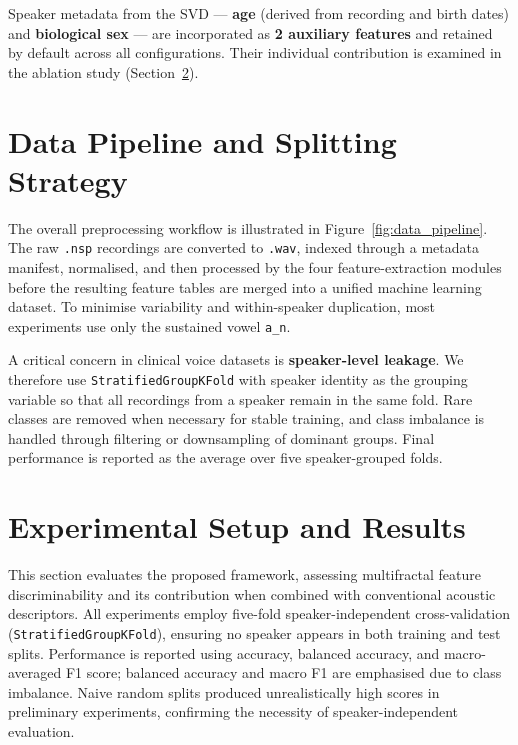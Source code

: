 \documentclass[conference]{IEEEtran}
\begin{document}
  Speaker metadata from the SVD — \textbf{age} (derived from recording and birth dates) and \textbf{biological sex} — are incorporated as \textbf{2 auxiliary features} and retained by default across all configurations. Their individual contribution is examined in the ablation study (Section~\ref{sec:experiments}).

  \section{Data Pipeline and Splitting Strategy}
  \label{sec:pipeline}

  The overall preprocessing workflow is illustrated in Figure~\ref{fig:data_pipeline}.
  The raw \texttt{.nsp} recordings are converted to \texttt{.wav}, indexed through a metadata manifest, normalised, and then processed by the four feature-extraction modules before the resulting feature tables are merged into a unified machine learning dataset. To minimise variability and within-speaker duplication, most experiments use only the sustained vowel \texttt{a\_n}.

  A critical concern in clinical voice datasets is \textbf{speaker-level leakage}. We therefore use \texttt{StratifiedGroupKFold} with speaker identity as the grouping variable so that all recordings from a speaker remain in the same fold. Rare classes are removed when necessary for stable training, and class imbalance is handled through filtering or downsampling of dominant groups. Final performance is reported as the average over five speaker-grouped folds.
  \section{Experimental Setup and Results}
  \label{sec:experiments}

  This section evaluates the proposed framework, assessing multifractal feature discriminability and its contribution when combined with conventional acoustic descriptors. All experiments employ five-fold speaker-independent cross-validation (\texttt{StratifiedGroupKFold}), ensuring no speaker appears in both training and test splits. Performance is reported using accuracy, balanced accuracy, and macro-averaged F1 score; balanced accuracy and macro F1 are emphasised due to class imbalance. Naive random splits produced unrealistically high scores in preliminary experiments, confirming the necessity of speaker-independent evaluation.
\end{document}
